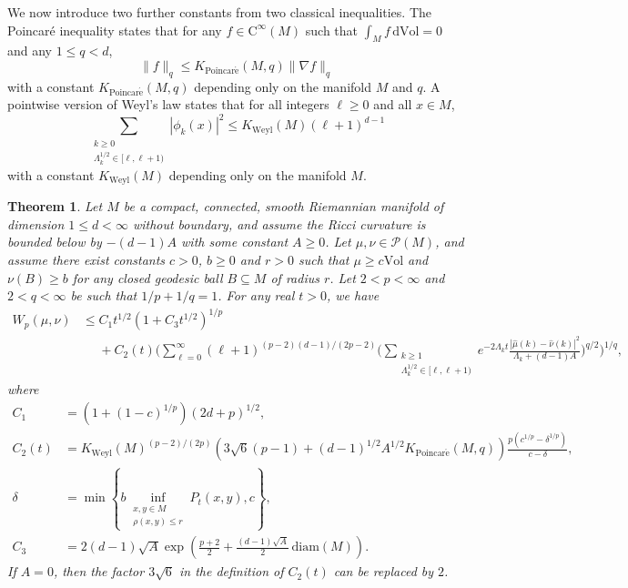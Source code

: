 \documentclass[11pt,a4paper]{article}
\newtheorem{thm}{Theorem}
\theoremstyle{definition}
\begin{document}
We now introduce two further constants from two classical inequalities. The Poincar\'e inequality \cite[p.\ 24]{HE} states that for any $f \in \mathrm{C}^{\infty} (M)$ such that $\int_M f \, \mathrm{d} \mathrm{Vol}=0$ and any $1 \le q < d$,
\begin{equation}\label{poincare}
\| f \|_q \le K_{\mathrm{Poincar\acute{e}}} (M,q) \| \nabla f \|_q
\end{equation}
with a constant $K_{\mathrm{Poincar\acute{e}}} (M,q)$ depending only on the manifold $M$ and $q$. A pointwise version of Weyl's law \cite[Theorem 3.3.1]{SO} states that for all integers $\ell \ge 0$ and all $x \in M$,
\begin{equation}\label{weyllaw}
\sum_{\substack{k \ge 0 \\ \Lambda_k^{1/2} \in [\ell, \ell+1)}} |\phi_k (x)|^2 \le K_{\mathrm{Weyl}}(M) (\ell+1)^{d-1}
\end{equation}
with a constant $K_{\mathrm{Weyl}}(M)$ depending only on the manifold $M$.

\begin{thm}\label{manifoldheatkernelp>2theorem} Let $M$ be a compact, connected, smooth Riemannian manifold of dimension $1 \le d < \infty$ without boundary, and assume the Ricci curvature is bounded below by $-(d-1)A$ with some constant $A \ge 0$. Let $\mu, \nu \in \mathcal{P}(M)$, and assume there exist constants $c>0$, $b \ge 0$ and $r>0$ such that $\mu \ge c \mathrm{Vol}$ and $\nu (B) \ge b$ for any closed geodesic ball $B \subseteq M$ of radius $r$. Let $2<p<\infty$ and $2<q<\infty$ be such that $1/p+1/q=1$. For any real $t>0$, we have
\[ \begin{split} W_p (\mu, \nu) &\le C_1 t^{1/2} (1+C_3 t^{1/2})^{1/p} \\ &{\phantom{\le}}+ C_2(t) \Bigg( \sum_{\ell=0}^{\infty} (\ell+1)^{(p-2)(d-1)/(2p-2)} \Bigg( \sum_{\substack{k \ge 1 \\ \Lambda_k^{1/2} \in [\ell, \ell+1)}} e^{-2\Lambda_k t} \frac{|\widehat{\mu}(k) - \widehat{\nu}(k)|^2}{\Lambda_k+(d-1)A} \Bigg)^{q/2} \Bigg)^{1/q}, \end{split} \]
where
\[ \begin{split} C_1 &= (1+(1-c)^{1/p}) (2d+p)^{1/2}, \\ C_2(t)&= K_{\mathrm{Weyl}}(M)^{(p-2)/(2p)} \left( 3 \sqrt{6} (p-1) + (d-1)^{1/2}A^{1/2} K_{\mathrm{Poincar\acute{e}}}(M,q) \right) \frac{p(c^{1/p}-\delta^{1/p})}{c-\delta}, \\ \delta &=\min \left\{ b \inf_{\substack{x,y \in M \\ \rho (x,y) \le r}} P_t (x,y) , c \right\} , \\ C_3 &= 2 (d-1) \sqrt{A} \exp \left( \frac{p+2}{2} + \frac{(d-1) \sqrt{A}}{2} \, \mathrm{diam}(M) \right) . \end{split} \]
If $A=0$, then the factor $3 \sqrt{6}$ in the definition of $C_2(t)$ can be replaced by $2$.
\end{thm}
\end{document}
